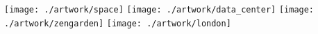 
\texttt{[image: ./artwork/space]}
\cleardoublepage
\texttt{[image: ./artwork/data\_center]}
\cleardoublepage
\texttt{[image: ./artwork/zengarden]}
\cleardoublepage
\texttt{[image: ./artwork/london]}
\cleardoublepage

\restoregeometry
